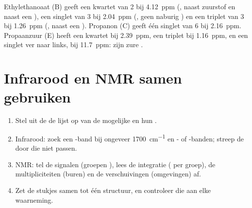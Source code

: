 \begin{example}\label{ex:g12:proton-nmr:reading}
Ethylethanoaat (B) geeft een kwartet van 2  bij \qty{4.12}{ppm}
(, naast zuurstof en naast een ), een singlet van 3
 bij \qty{2.04}{ppm} (, geen naburig ) en een
triplet van 3  bij \qty{1.26}{ppm} (, naast een
). Propanon (C) geeft één singlet van 6  bij
\qty{2.16}{ppm}. Propaanzuur (E) heeft een kwartet bij \qty{2.39}{ppm},
een triplet bij \qty{1.16}{ppm}, en een singlet ver naar links, bij
\qty{11.7}{ppm}: zijn zure .
\end{example}

\section{Infrarood en NMR samen gebruiken}


\begin{method}\label{met:g12:proton-nmr:identify}
\begin{enumerate}
  \item Stel uit de  de lijst op van de mogelijke
         en hun .
  \item Infrarood: zoek een -band bij ongeveer
        \qty{1700}{cm^{-1}} en - of -banden; streep de
         door die niet passen.
  \item NMR: tel de signalen (groepen ), lees de
        integratie ( per groep), de multipliciteiten (buren) en
        de verschuivingen (omgevingen) af.
  \item Zet de stukjes samen tot één structuur, en controleer die aan
        elke waarneming.
\end{enumerate}
\end{method}

